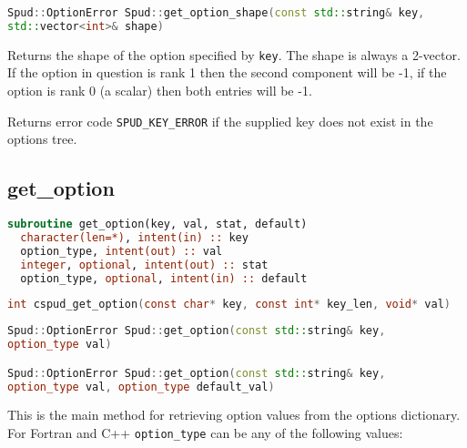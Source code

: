 \documentclass[a4paper, 11pt]{book}
\begin{document}
\begin{lstlisting}[language=C++]
Spud::OptionError Spud::get_option_shape(const std::string& key,
std::vector<int>& shape)
\end{lstlisting}

Returns the shape of the option specified by \lstinline+key+. The shape is
always a 2-vector. If the option in question is rank 1 then the second
component will be -1, if the option is rank 0 (a scalar) then both entries
will be -1.

Returns error code \lstinline+SPUD_KEY_ERROR+ if the supplied key does not
exist in the options tree.

\subsection{get\_option}\label{sec:get_option}

\begin{lstlisting}[language=fortran,emph=option_type,emphstyle=\textit]
subroutine get_option(key, val, stat, default)
  character(len=*), intent(in) :: key
  option_type, intent(out) :: val
  integer, optional, intent(out) :: stat
  option_type, optional, intent(in) :: default
\end{lstlisting}

\begin{lstlisting}[language=C,emph=option_type,emphstyle=\textit]
int cspud_get_option(const char* key, const int* key_len, void* val)
\end{lstlisting}

\begin{lstlisting}[language=C++,emph=option_type,emphstyle=\textit]
Spud::OptionError Spud::get_option(const std::string& key,
option_type val)

Spud::OptionError Spud::get_option(const std::string& key,
option_type val, option_type default_val)
\end{lstlisting}

This is the main method for retrieving option values from the options
dictionary. For Fortran and C++
\lstinline[emph=option_type,emphstyle=\textit]+option_type+ can be any of the
following values:
\end{document}
